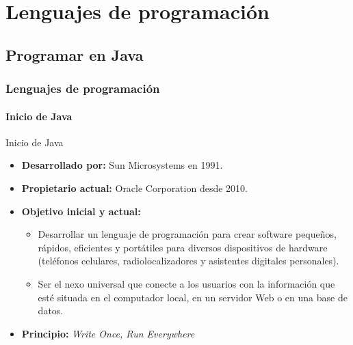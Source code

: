 \documentclass{beamer}
\begin{document}
	\section{Lenguajes de programaci\'on}

		\subsection{Programar en Java}

		\begin{frame}
			\frametitle{Lenguajes de programaci\'on}
			\framesubtitle{Inicio de Java}

			\begin{exampleblock}{Inicio de Java}
				\begin{itemize}
					\item \textbf{Desarrollado por:} Sun Microsystems en 1991.
					\item \textbf{Propietario actual:} Oracle Corporation desde 2010.
					\item \textbf{Objetivo inicial y actual:}
					\begin{itemize}
						\item Desarrollar un lenguaje de programaci\'on para crear software peque\~nos, r\'apidos, eficientes y port\'atiles para diversos dispositivos de hardware (tel\'efonos celulares, radiolocalizadores y asistentes digitales personales).
						\item Ser el nexo universal que conecte a los usuarios con la informaci\'on que est\'e situada en el computador local, en un servidor Web o en una base de datos.
					\end{itemize}
					\item \textbf{Principio:} \emph{Write Once, Run Everywhere}
				\end{itemize}
			\end{exampleblock}
		\end{frame}
\end{document}

